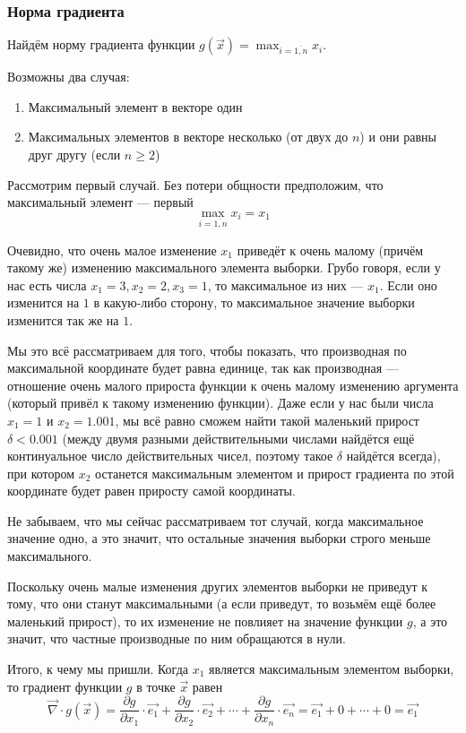 \subsubsection{Норма градиента}
Найдём норму градиента функции
$g\left( \vec{x} \right) = \max_{i=\overline{1,n}} x_i$.

Возможны два случая:
\begin{enumerate}
    \item Максимальный элемент в векторе один
    \item Максимальных элементов в векторе несколько
        (от двух до $n$) и они равны друг другу (если $n \ge 2$)
\end{enumerate}

Рассмотрим первый случай. Без потери общности предположим,
что максимальный элемент --- первый
$$\max_{i=\overline{1,n}} x_i = x_1$$

Очевидно, что очень малое изменение $x_1$ приведёт к
очень малому (причём такому же) изменению максимального элемента выборки.
Грубо говоря, если у нас есть числа $x_1 = 3, x_2 = 2, x_3 = 1$,
то максимальное из них --- $x_1$. Если оно изменится на $1$
в какую-либо сторону, то максимальное значение выборки изменится
так же на $1$.

Мы это всё рассматриваем для того, чтобы показать,
что производная по максимальной координате будет равна единице,
так как производная --- отношение очень малого прироста функции
к очень малому изменению аргумента (который привёл к такому изменению функции).
Даже если у нас были числа $x_1 = 1$ и $x_2 = 1.001$,
мы всё равно сможем найти такой маленький прирост $\delta < 0.001$
(между двумя разными действительными числами найдётся ещё континуальное число
действительных чисел, поэтому такое $\delta$ найдётся всегда),
при котором $x_2$ останется максимальным элементом и прирост градиента
по этой координате будет равен приросту самой координаты.

Не забываем, что мы сейчас рассматриваем тот случай,
когда максимальное значение одно, а это значит,
что остальные значения выборки строго меньше максимального.

Поскольку очень малые изменения других элементов выборки не приведут к тому,
что они станут максимальными (а если приведут, то возьмём ещё более
маленький прирост), то их изменение не повлияет на значение функции $g$,
а это значит, что частные производные по ним обращаются в нули.

Итого, к чему мы пришли.
Когда $x_1$ является максимальным элементом выборки,
то градиент функции $g$ в точке $\vec{x}$ равен
$$\vec{\nabla} \cdot g\left( \vec{x} \right)
    = \frac{\partial g}{\partial x_1} \cdot \vec{e_1}
        + \frac{\partial g}{\partial x_2} \cdot \vec{e_2}
        + \cdots
        + \frac{\partial g}{\partial x_n} \cdot \vec{e_n}
    = \vec{e_1} + 0 + \cdots + 0 = \vec{e_1}$$

